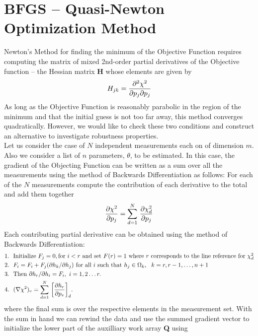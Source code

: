 \section{BFGS -- Quasi-Newton Optimization Method}
Newton's Method for finding the minimum of the Objective Function requires computing the matrix of mixed 2nd-order partial derivatives of the Objective function -- the Hessian matrix {\bf H} whose elements are given by 
$$ H_{jk} = {\partial^2 \chi^2\over \partial p_j \partial p_j}$$As long as the Objective Function is reasonably parabolic in the region of the minimum and that the initial guess is not too far away, this method converges quadratically. 
However, we would like to check these two conditions and construct an alternative to investigate robustness properties.\\

Let us consider the case of $N$ independent measurements each on of dimension $m$. Also we consider a list of $n$ parameters, $\theta$, to be estimated. In this case, the gradient of the Objecting Function can be written as a sum over all the measurements using the method of Backwards Differentiation as follows: 
For each of the $N$ measurements compute the contribution of each derivative to the total and add them together
$${\partial \chi^2\over \partial p_j} = \sum_{d=1}^N\, {\partial \chi^2_d \over \partial p_j}$$Each contributing partial derivative can be obtained using the 
method of Backwards Differentiation: 
\begin{align*}
1. ~~ & \hbox{Initialize}\ F_j = 0, \hbox{for}\ i<r \hbox{ and set } F(r) = 1 \hbox{ where $r$ corresponds to the line reference for $\chi_d^2$}\\
2. ~~& F_i = F_i + F_j (\partial h_k/\partial h_j) \hbox{ for all } i \hbox{ such that } h_j \in \Omega_k, ~~ k = r, r-1, \hdots, n+1\\
3. ~~&\hbox{Then } \partial h_r/\partial h_i = F_i, ~i = 1,2\hdots r.\\
4. ~~&(\nabla\chi^2)_v = \sum_{d=1}^N\, \bigg[{\partial h_r \over \partial p_v}\bigg]_d.
\end{align*}where the final sum is over the respective elements in the measurement set. With the sum in hand we can rewind the data and use the summed gradient vector to initialize the lower part of the auxilliary work array {\bf Q} using

